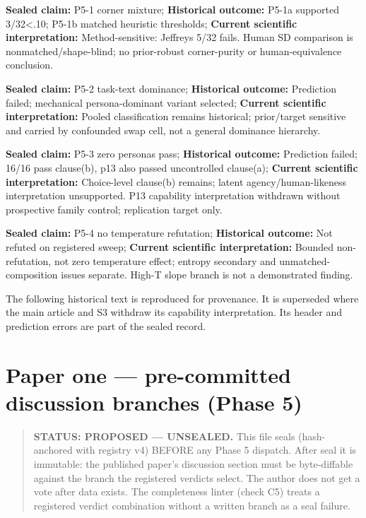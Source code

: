 \documentclass[11pt]{article}
\begin{document}
\textbf{Sealed claim:} P5-1 corner mixture; \textbf{Historical outcome:}
P5-1a supported 3/32\textless.10; P5-1b matched heuristic thresholds;
\textbf{Current scientific interpretation:} Method-sensitive: Jeffreys
5/32 fails. Human SD comparison is nonmatched/shape-blind; no
prior-robust corner-purity or human-equivalence conclusion.

\textbf{Sealed claim:} P5-2 task-text dominance; \textbf{Historical
outcome:} Prediction failed; mechanical persona-dominant variant
selected; \textbf{Current scientific interpretation:} Pooled
classification remains historical; prior/target sensitive and carried by
confounded swap cell, not a general dominance hierarchy.

\textbf{Sealed claim:} P5-3 zero personas pass; \textbf{Historical
outcome:} Prediction failed; 16/16 pass clause(b), p13 also passed
uncontrolled clause(a); \textbf{Current scientific interpretation:}
Choice-level clause(b) remains; latent agency/human-likeness
interpretation unsupported. P13 capability interpretation withdrawn
without prospective family control; replication target only.

\textbf{Sealed claim:} P5-4 no temperature refutation;
\textbf{Historical outcome:} Not refuted on registered sweep;
\textbf{Current scientific interpretation:} Bounded non-refutation, not
zero temperature effect; entropy secondary and unmatched-composition
issues separate. High-T slope branch is not a demonstrated finding.

The following historical text is reproduced for provenance. It is
superseded where the main article and S3 withdraw its capability
interpretation. Its header and prediction errors are part of the sealed
record.

\section{Paper one --- pre-committed discussion branches (Phase
5)}\label{paper-one-pre-committed-discussion-branches-phase-5}

\begin{quote}
\textbf{STATUS: PROPOSED --- UNSEALED.} This file seals (hash-anchored
with registry v4) BEFORE any Phase 5 dispatch. After seal it is
immutable: the published paper's discussion section must be
byte-diffable against the branch the registered verdicts select. The
author does not get a vote after data exists. The completeness linter
(check C5) treats a registered verdict combination without a written
branch as a seal failure.
\end{quote}
\end{document}
